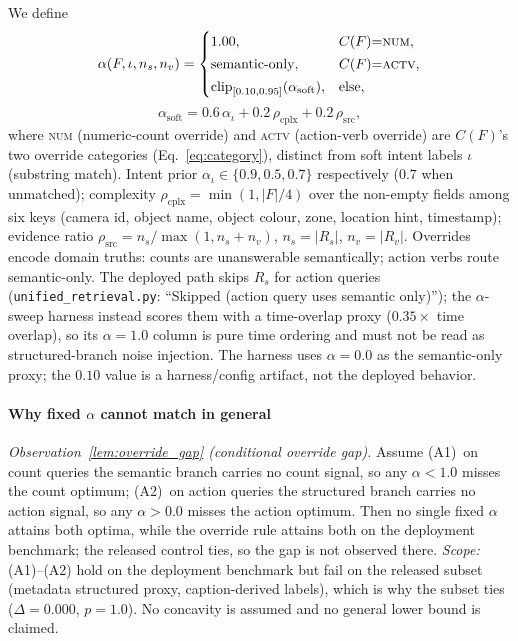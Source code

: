 ﻿\documentclass[conference]{IEEEtran}
\theoremstyle{plain}
\begin{document}
We define
\begin{equation}
\alpha(F,\iota,n_s,n_v) =
\begin{cases}
1.00, & C(F){=}\textsc{num}, \\[2pt]
\text{semantic-only}, & C(F){=}\textsc{actv}, \\[2pt]
\mathrm{clip}_{[0.10,0.95]}(\alpha_{\text{soft}}), & \text{else},
\end{cases}
\label{eq:adaptive_alpha}
\end{equation}
\begin{equation}
\alpha_{\text{soft}} = 0.6\,\alpha_\iota + 0.2\,\rho_{\text{cplx}} + 0.2\,\rho_{\text{src}},
\label{eq:alpha_soft}
\end{equation}
where \textsc{num} (numeric-count override) and \textsc{actv} (action-verb override) are $C(F)$'s two override categories (Eq.~\eqref{eq:category}), distinct from soft intent labels $\iota$ (substring match). Intent prior $\alpha_\iota\in\{0.9,\allowbreak 0.5,\allowbreak 0.7\}$ respectively ($0.7$ when unmatched); complexity $\rho_{\text{cplx}}=\min(1,|F|/4)$ over the non-empty fields among six keys (camera id, object name, object colour, zone, location hint, timestamp); evidence ratio $\rho_{\text{src}}=n_s/\max(1,n_s+n_v)$, $n_s=|R_s|$, $n_v=|R_v|$. Overrides encode domain truths: counts are unanswerable semantically; action verbs route semantic-only. The deployed path skips $R_s$ for action queries (\texttt{unified\_retrieval.py}: ``Skipped (action query uses semantic only)''); the $\alpha$-sweep harness instead scores them with a time-overlap proxy ($0.35{\times}$ time overlap), so its $\alpha{=}1.0$ column is pure time ordering and must not be read as structured-branch noise injection. The harness uses $\alpha{=}0.0$ as the semantic-only proxy; the $0.10$ value is a harness/config artifact, not the deployed behavior.

\paragraph*{Why fixed \texorpdfstring{$\alpha$}{alpha} cannot match in general}
\label{lem:override_gap}\emph{Observation~\ref{lem:override_gap} (conditional override gap).} Assume (A1)~on count queries the semantic branch carries no count signal, so any $\alpha{<}1.0$ misses the count optimum; (A2)~on action queries the structured branch carries no action signal, so any $\alpha{>}0.0$ misses the action optimum. Then no single fixed $\alpha$ attains both optima, while the override rule attains both on the deployment benchmark; the released control ties, so the gap is not observed there. \emph{Scope:} (A1)--(A2) hold on the deployment benchmark but fail on the released subset (metadata structured proxy, caption-derived labels), which is why the subset ties ($\Delta{=}0.000$, $p{=}1.0$). No concavity is assumed and no general lower bound is claimed.
\end{document}
